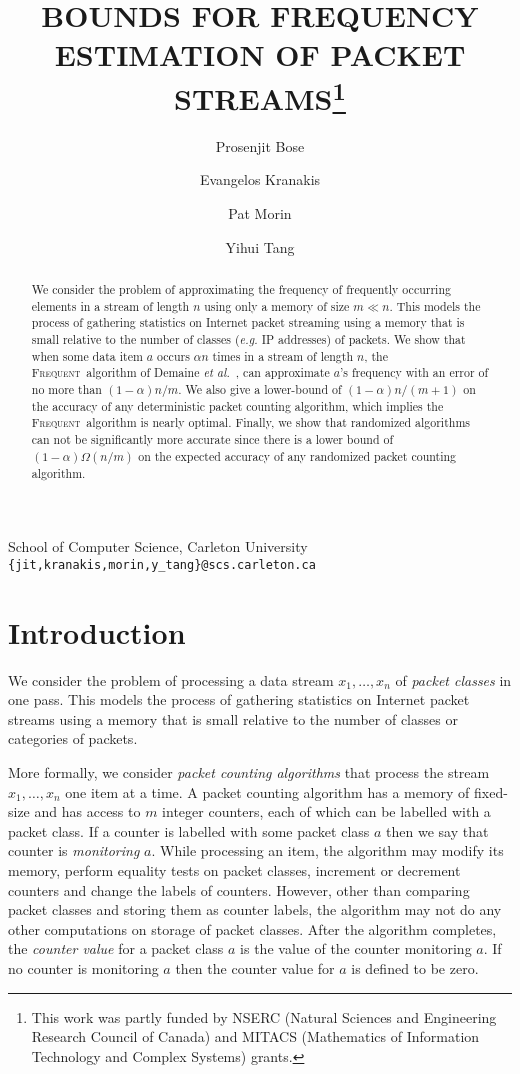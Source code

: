 \documentclass[charterfonts,lotsofwhite]{patmorin}
\title{\MakeUppercase{Bounds for Frequency Estimation of Packet
Streams}\thanks{This work was partly funded by NSERC (Natural Sciences
and Engineering Research Council of Canada) and MITACS (Mathematics of
Information Technology and Complex Systems) grants.}}
\author{Prosenjit Bose \and
	Evangelos Kranakis \and
	Pat Morin \and
	Yihui Tang}
\date{}
\newcommand{\frequent}{\textsc{Frequent}}
\newcommand{\etal}{\emph{et al.}}
\begin{document}
\maketitle
\vspace{-1.25cm}
\begin{center}
School of Computer Science, Carleton University \\
\texttt{\{jit,kranakis,morin,y\_tang\}@scs.carleton.ca}
\end{center}

\begin{abstract}
We consider the problem of approximating the frequency of frequently
occurring elements in a stream of length $n$ using only a memory of
size $m\ll n$. This models the process of gathering statistics on Internet 
packet streaming using a memory that is small relative to the number of
classes ({\it e.g.} IP addresses) of packets. We show that when some 
data item $a$ occurs $\alpha n$ times in a stream 
of length $n$, the \frequent\ algorithm of Demaine \etal\ \cite{dlom02}, 
can approximate $a$'s frequency with an error of no more than 
$(1-\alpha)n/m$. We also give a lower-bound of $(1-\alpha)n/(m+1)$ on 
the accuracy of any deterministic packet counting algorithm, which implies 
the  \frequent\ algorithm is nearly optimal. Finally, we show that randomized 
algorithms can not be significantly more accurate since there is a lower 
bound of $(1-\alpha)\Omega(n/m)$ on the expected accuracy of any randomized 
packet counting algorithm. 
\end{abstract}




\section{Introduction}

We consider the problem of processing a data stream $x_1,\ldots,x_n$
of \emph{packet classes} in one pass.  This models the process of
gathering statistics on Internet packet streams using a memory that is
small relative to the number of classes or categories of packets.

More formally, we consider \emph{packet counting algorithms} that
process the stream $x_1,\ldots,x_n$ one item at a time.  A packet
counting algorithm has a memory of fixed-size and has access to $m$
integer counters, each of which can be labelled with a packet class.
If a counter is labelled with some packet class $a$ then we say that
counter is \emph{monitoring} $a$.  While processing an item, the
algorithm may modify its memory, perform equality tests on packet
classes, increment or decrement counters and change the labels of
counters.  However, other than comparing packet classes and storing
them as counter labels, the algorithm may not do any other
computations on storage of packet classes.  After the algorithm
completes, the \emph{counter value} for a packet class $a$ is the
value of the counter monitoring $a$. If no counter is monitoring $a$
then the counter value for $a$ is defined to be zero.
\end{document}
